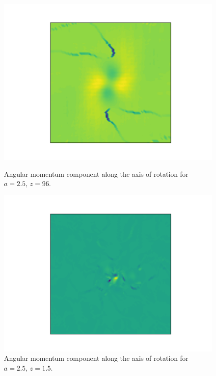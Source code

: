 \documentclass[a4paper,11pt]{article}
\begin{document}
\begin{figure}[!htb]
  \includegraphics[trim={2cm 0 1cm 0cm},scale=0.55]{ang_mom_early.png}
  \caption{Angular momentum component along the axis of rotation for $a = 2.5$, $z = 96$.}\label{fig:ang_mom_early}
\endminipage\hfill
{}
  \includegraphics[trim={2cm 0 1cm 0cm},scale=0.55]{ang_mom_complete.png}
  \caption{Angular momentum component along the axis of rotation for $a = 2.5$, $z = 1.5$.}\label{fig:ang_mom_complete}
\endminipage\hfill
\end{figure}
\end{document}
